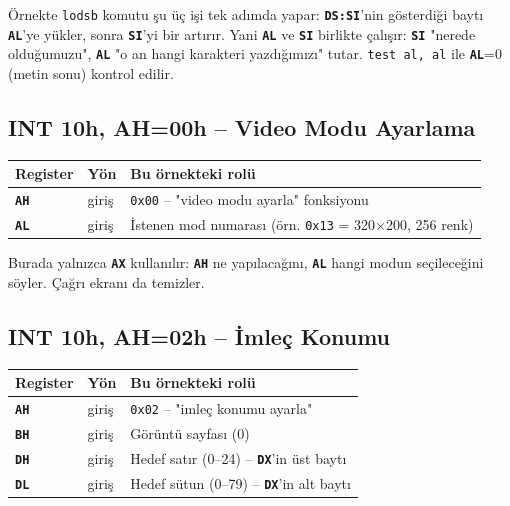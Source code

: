 \documentclass[11pt,a4paper]{article}
\newcommand{\reg}[1]{\texttt{\color{anaMavi}\textbf{#1}}}
\newcommand{\hx}[1]{\texttt{\color{turuncu}#1}}
\newcommand{\kod}[1]{\texttt{\color{koyuGri}#1}}
\begin{document}
\begin{notkutu}
Örnekte \kod{lodsb} komutu şu üç işi tek adımda yapar: \reg{DS:SI}'nin
gösterdiği baytı \reg{AL}'ye yükler, sonra \reg{SI}'yi bir artırır. Yani
\reg{AL} ve \reg{SI} birlikte çalışır: \reg{SI} "nerede olduğumuzu", \reg{AL}
"o an hangi karakteri yazdığımızı" tutar. \kod{test al, al} ile \reg{AL}=0
(metin sonu) kontrol edilir.
\end{notkutu}

\subsection{INT 10h, AH=00h -- Video Modu Ayarlama}

\begin{center}
\begin{tabularx}{\textwidth}{@{}l l >{\raggedright\arraybackslash}X@{}}
\toprule
\rowcolor{anaMavi}\color{white}\textbf{Register} & \color{white}\textbf{Yön} & \color{white}\textbf{Bu örnekteki rolü} \\
\midrule
\reg{AH} & giriş & \hx{0x00} -- "video modu ayarla" fonksiyonu \\
\rowcolor{acikGri} \reg{AL} & giriş & İstenen mod numarası (örn. \hx{0x13} = 320$\times$200, 256 renk) \\
\bottomrule
\end{tabularx}
\end{center}
Burada yalnızca \reg{AX} kullanılır: \reg{AH} ne yapılacağını, \reg{AL} hangi
modun seçileceğini söyler. Çağrı ekranı da temizler.

\subsection{INT 10h, AH=02h -- İmleç Konumu}

\begin{center}
\begin{tabularx}{\textwidth}{@{}l l >{\raggedright\arraybackslash}X@{}}
\toprule
\rowcolor{anaMavi}\color{white}\textbf{Register} & \color{white}\textbf{Yön} & \color{white}\textbf{Bu örnekteki rolü} \\
\midrule
\reg{AH} & giriş & \hx{0x02} -- "imleç konumu ayarla" \\
\rowcolor{acikGri} \reg{BH} & giriş & Görüntü sayfası (0) \\
\reg{DH} & giriş & Hedef satır (0--24) -- \reg{DX}'in üst baytı \\
\rowcolor{acikGri} \reg{DL} & giriş & Hedef sütun (0--79) -- \reg{DX}'in alt baytı \\
\bottomrule
\end{tabularx}
\end{center}
\end{document}
